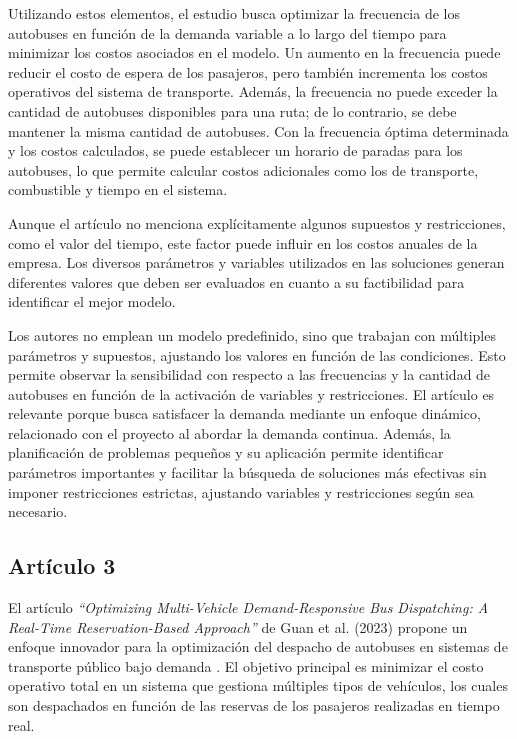 \documentclass[preprint,11pt]{elsarticle}
\begin{document}
Utilizando estos elementos, el estudio busca optimizar la frecuencia de los autobuses en función de la demanda variable a lo largo del tiempo para minimizar los costos asociados en el modelo. Un aumento en la frecuencia puede reducir el costo de espera de los pasajeros, pero también incrementa los costos operativos del sistema de transporte. Además, la frecuencia no puede exceder la cantidad de autobuses disponibles para una ruta; de lo contrario, se debe mantener la misma cantidad de autobuses. Con la frecuencia óptima determinada y los costos calculados, se puede establecer un horario de paradas para los autobuses, lo que permite calcular costos adicionales como los de transporte, combustible y tiempo en el sistema.

Aunque el artículo no menciona explícitamente algunos supuestos y restricciones, como el valor del tiempo, este factor puede influir en los costos anuales de la empresa. Los diversos parámetros y variables utilizados en las soluciones generan diferentes valores que deben ser evaluados en cuanto a su factibilidad para identificar el mejor modelo.

Los autores no emplean un modelo predefinido, sino que trabajan con múltiples parámetros y supuestos, ajustando los valores en función de las condiciones. Esto permite observar la sensibilidad con respecto a las frecuencias y la cantidad de autobuses en función de la activación de variables y restricciones. El artículo es relevante porque busca satisfacer la demanda mediante un enfoque dinámico, relacionado con el proyecto al abordar la demanda continua. Además, la planificación de problemas pequeños y su aplicación permite identificar parámetros importantes y facilitar la búsqueda de soluciones más efectivas sin imponer restricciones estrictas, ajustando variables y restricciones según sea necesario.


\subsection*{Artículo 3}

El artículo \textit{“Optimizing Multi-Vehicle Demand-Responsive Bus Dispatching: A Real-Time Reservation-Based Approach”} de Guan et al. (2023) propone un enfoque innovador para la optimización del despacho de autobuses en sistemas de transporte público bajo demanda \parencite{guan2023}. El objetivo principal es minimizar el costo operativo total en un sistema que gestiona múltiples tipos de vehículos, los cuales son despachados en función de las reservas de los pasajeros realizadas en tiempo real.
\end{document}
